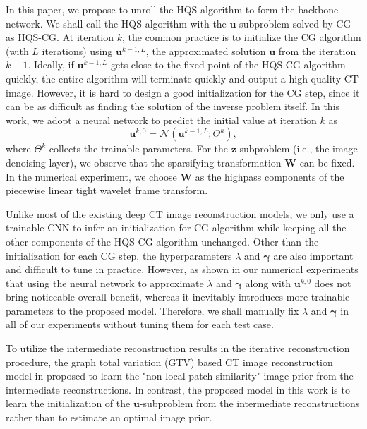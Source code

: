 \documentclass[journal,twoside]{IEEEtran}
\begin{document}
In this paper, we propose to unroll the HQS algorithm to form the backbone network. We shall call the HQS algorithm with the $\bm{u}$-subproblem solved by CG as HQS-CG. At iteration $k$, the common practice is to initialize the CG algorithm (with  $L$ iterations) using $\bm{u}^{k-1,L}$, the approximated solution $\bm{u}$ from the iteration $k-1$. Ideally, if $\bm{u}^{k-1,L}$ gets close to the fixed point of the HQS-CG algorithm quickly, the entire algorithm will terminate quickly and output a high-quality CT image. However, it is hard to design a good initialization for the CG step, since it can be as difficult as finding the solution of the inverse problem itself. In this work, we adopt a neural network to predict the initial value at iteration $k$ as
$$\bm{u}^{k,0}=\mathcal{N}(\bm{u}^{k-1,L};\Theta^k),$$
where $\Theta^{k}$ collects the trainable parameters. 
For the $\bm{z}$-subproblem (i.e., the image denoising layer), we observe that the sparsifying transformation $\bm{W}$ can be fixed. In the numerical experiment, we choose $\bm{W}$ as the highpass components of the piecewise linear tight wavelet frame transform. 

Unlike most of the existing deep CT image reconstruction models, we only use a trainable CNN to infer an initialization for CG algorithm while keeping all the other components of the HQS-CG algorithm unchanged. Other than the initialization for each CG step, the hyperparameters $\lambda$ and $\bm{\gamma}$ are also important and difficult to tune in practice. However, as shown in our numerical experiments that using the neural network to approximate $\lambda$ and $\bm{\gamma}$ along with $\bm{u}^{k,0}$ does not bring noticeable overall benefit, whereas it inevitably introduces more trainable parameters to the proposed model. Therefore, we shall manually fix $\lambda$ and $\bm{\gamma}$ in all of our experiments without tuning them for each test case.   

To utilize the intermediate reconstruction results in the iterative reconstruction procedure, the graph total variation (GTV) based CT image reconstruction model in \cite{mahmood2018adaptive} proposed to learn the "non-local patch similarity" image prior from the intermediate reconstructions. In contrast, the proposed model in this work is to learn the initialization of the $\bm{u}$-subproblem from the intermediate reconstructions rather than to estimate an optimal image prior. 
\end{document}
